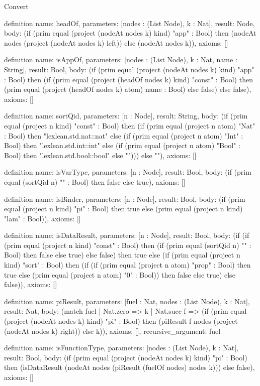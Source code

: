 \begin{lexlean}{Convert}
\begin{semanticmodule}
definition{
  name: headOf,
  parameters: [nodes : (List Node), k : Nat],
  result: Node,
  body: (if (prim equal (project (nodeAt nodes k) kind) "app" : Bool) then (nodeAt nodes (project (nodeAt nodes k) left)) else (nodeAt nodes k)),
  axioms: []
}

definition{
  name: isAppOf,
  parameters: [nodes : (List Node), k : Nat, name : String],
  result: Bool,
  body: (if (prim equal (project (nodeAt nodes k) kind) "app" : Bool) then (if (prim equal (project (headOf nodes k) kind) "const" : Bool) then (prim equal (project (headOf nodes k) atom) name : Bool) else false) else false),
  axioms: []
}

definition{
  name: sortQid,
  parameters: [n : Node],
  result: String,
  body: (if (prim equal (project n kind) "const" : Bool) then (if (prim equal (project n atom) "Nat" : Bool) then "lexlean.std.nat::nat" else (if (prim equal (project n atom) "Int" : Bool) then "lexlean.std.int::int" else (if (prim equal (project n atom) "Bool" : Bool) then "lexlean.std.bool::bool" else ""))) else ""),
  axioms: []
}

definition{
  name: isVarType,
  parameters: [n : Node],
  result: Bool,
  body: (if (prim equal (sortQid n) "" : Bool) then false else true),
  axioms: []
}

definition{
  name: isBinder,
  parameters: [n : Node],
  result: Bool,
  body: (if (prim equal (project n kind) "pi" : Bool) then true else (prim equal (project n kind) "lam" : Bool)),
  axioms: []
}

definition{
  name: isDataResult,
  parameters: [n : Node],
  result: Bool,
  body: (if (if (prim equal (project n kind) "const" : Bool) then (if (prim equal (sortQid n) "" : Bool) then false else true) else false) then true else (if (prim equal (project n kind) "sort" : Bool) then (if (if (prim equal (project n atom) "prop" : Bool) then true else (prim equal (project n atom) "0" : Bool)) then false else true) else false)),
  axioms: []
}

definition{
  name: piResult,
  parameters: [fuel : Nat, nodes : (List Node), k : Nat],
  result: Nat,
  body: (match fuel
    | Nat.zero => k
    | Nat.succ f => (if (prim equal (project (nodeAt nodes k) kind) "pi" : Bool) then (piResult f nodes (project (nodeAt nodes k) right)) else k)),
  axioms: [],
  recursive_argument: fuel
}

definition{
  name: isFunctionType,
  parameters: [nodes : (List Node), k : Nat],
  result: Bool,
  body: (if (prim equal (project (nodeAt nodes k) kind) "pi" : Bool) then (isDataResult (nodeAt nodes (piResult (fuelOf nodes) nodes k))) else false),
  axioms: []
}


\end{semanticmodule}
\end{lexlean}
